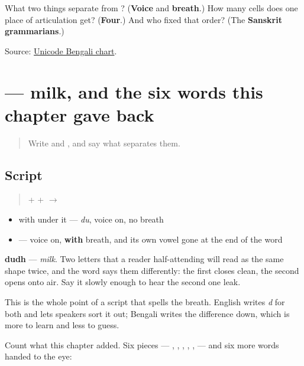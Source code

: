 \begin{tcolorbox}[breakable,colback=teal!4,colframe=teal!35!black,title={Before you move on}]
What two things separate \textbf{} from \textbf{}? (\textbf{Voice} and \textbf{breath}.) How many cells does one place of articulation get? (\textbf{Four}.) And who fixed that order? (The \textbf{Sanskrit grammarians}.)

Source: \href{https://www.unicode.org/charts/PDF/U0980.pdf}{Unicode Bengali chart}.
\end{tcolorbox}
\section[dudh]{ — milk, and the six words this chapter gave back}

\label{lesson:BN-W03-dudh-read}



\begin{quote}
Write \textbf{} and \textbf{}, and say what separates them.
\end{quote}

\subsection*{Script}
\begin{quote}
\textbf{} + \textbf{} + \textbf{} $\to$ \textbf{}
\end{quote}

\begin{itemize}
\raggedright
  \item \textbf{} with \textbf{} under it — \emph{du}, voice on, no breath
  \item \textbf{} — voice on, \textbf{with} breath, and its own vowel gone at the end of the word
\end{itemize}

\textbf{dudh} — \emph{milk}. Two letters that a reader half-attending will read as the same shape twice, and the word says them differently: the first closes clean, the second opens onto air. Say it slowly enough to hear the second one leak.

This is the whole point of a script that spells the breath. English writes \emph{d} for both and lets speakers sort it out; Bengali writes the difference down, which is more to learn and less to guess.

Count what this chapter added. Six pieces — \textbf{}, \textbf{}, \textbf{}, \textbf{}, \textbf{}, \textbf{} — and six more words handed to the eye:

